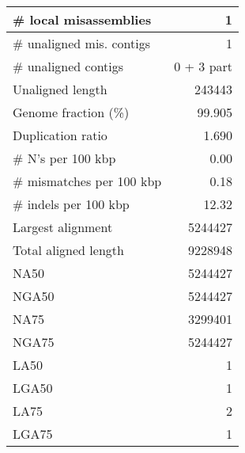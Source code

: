 \documentclass[12pt,a4paper]{article}
\begin{document}
\begin{table}[ht]
\begin{center}
\begin{tabular}{|l*{1}{|r}|}
\# local misassemblies & 1 \\ \hline
\# unaligned mis. contigs & 1 \\ \hline
\# unaligned contigs & 0 + 3 part \\ \hline
Unaligned length & 243443 \\ \hline
Genome fraction (\%) & 99.905 \\ \hline
Duplication ratio & 1.690 \\ \hline
\# N's per 100 kbp & 0.00 \\ \hline
\# mismatches per 100 kbp & 0.18 \\ \hline
\# indels per 100 kbp & 12.32 \\ \hline
Largest alignment & 5244427 \\ \hline
Total aligned length & 9228948 \\ \hline
NA50 & 5244427 \\ \hline
NGA50 & 5244427 \\ \hline
NA75 & 3299401 \\ \hline
NGA75 & 5244427 \\ \hline
LA50 & 1 \\ \hline
LGA50 & 1 \\ \hline
LA75 & 2 \\ \hline
LGA75 & 1 \\ \hline
\end{tabular}
\end{center}
\end{table}
\end{document}
